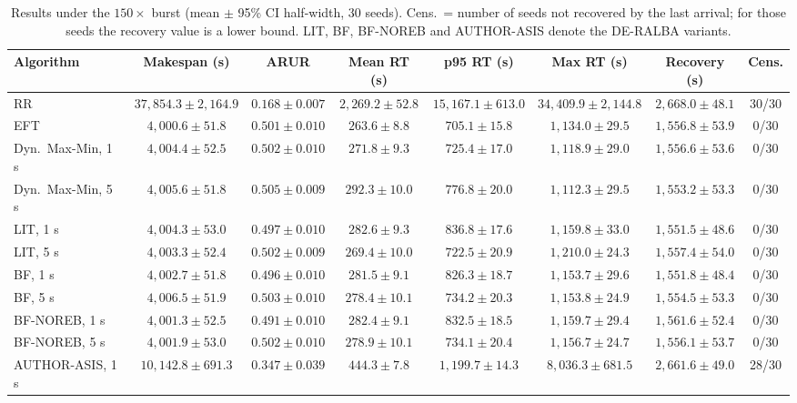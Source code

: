 \documentclass[default,sn-mathphys,Numbered]{sn-jnl}
\begin{document}
\begin{table}[h]
\caption{Results under the $150\times$ burst (mean $\pm$ 95\% CI half-width, 30 seeds). Cens.\ = number of seeds not recovered by the last arrival; for those seeds the recovery value is a lower bound. LIT, BF, BF-NOREB and AUTHOR-ASIS denote the DE-RALBA variants.}\label{tab:x150}
\centering
\fontsize{6.0pt}{7.4pt}\selectfont
\setlength{\tabcolsep}{2.6pt}
\begin{tabular}{lccccccc}
\toprule
Algorithm & Makespan (s) & ARUR & Mean RT (s) & p95 RT (s) & Max RT (s) & Recovery (s) & Cens. \\
\midrule
RR & $37{,}854.3\pm 2{,}164.9$ & $0.168\pm 0.007$ & $2{,}269.2\pm 52.8$ & $15{,}167.1\pm 613.0$ & $34{,}409.9\pm 2{,}144.8$ & $2{,}668.0\pm 48.1$ & 30/30 \\
EFT & $4{,}000.6\pm 51.8$ & $0.501\pm 0.010$ & $263.6\pm 8.8$ & $705.1\pm 15.8$ & $1{,}134.0\pm 29.5$ & $1{,}556.8\pm 53.9$ & 0/30 \\
Dyn.\ Max-Min, 1 s & $4{,}004.4\pm 52.5$ & $0.502\pm 0.010$ & $271.8\pm 9.3$ & $725.4\pm 17.0$ & $1{,}118.9\pm 29.0$ & $1{,}556.6\pm 53.6$ & 0/30 \\
Dyn.\ Max-Min, 5 s & $4{,}005.6\pm 51.8$ & $0.505\pm 0.009$ & $292.3\pm 10.0$ & $776.8\pm 20.0$ & $1{,}112.3\pm 29.5$ & $1{,}553.2\pm 53.3$ & 0/30 \\
LIT, 1 s & $4{,}004.3\pm 53.0$ & $0.497\pm 0.010$ & $282.6\pm 9.3$ & $836.8\pm 17.6$ & $1{,}159.8\pm 33.0$ & $1{,}551.5\pm 48.6$ & 0/30 \\
LIT, 5 s & $4{,}003.3\pm 52.4$ & $0.502\pm 0.009$ & $269.4\pm 10.0$ & $722.5\pm 20.9$ & $1{,}210.0\pm 24.3$ & $1{,}557.4\pm 54.0$ & 0/30 \\
BF, 1 s & $4{,}002.7\pm 51.8$ & $0.496\pm 0.010$ & $281.5\pm 9.1$ & $826.3\pm 18.7$ & $1{,}153.7\pm 29.6$ & $1{,}551.8\pm 48.4$ & 0/30 \\
BF, 5 s & $4{,}006.5\pm 51.9$ & $0.503\pm 0.010$ & $278.4\pm 10.1$ & $734.2\pm 20.3$ & $1{,}153.8\pm 24.9$ & $1{,}554.5\pm 53.3$ & 0/30 \\
BF-NOREB, 1 s & $4{,}001.3\pm 52.5$ & $0.491\pm 0.010$ & $282.4\pm 9.1$ & $832.5\pm 18.5$ & $1{,}159.7\pm 29.4$ & $1{,}561.6\pm 52.4$ & 0/30 \\
BF-NOREB, 5 s & $4{,}001.9\pm 53.0$ & $0.502\pm 0.010$ & $278.9\pm 10.1$ & $734.1\pm 20.4$ & $1{,}156.7\pm 24.7$ & $1{,}556.1\pm 53.7$ & 0/30 \\
AUTHOR-ASIS, 1 s & $10{,}142.8\pm 691.3$ & $0.347\pm 0.039$ & $444.3\pm 7.8$ & $1{,}199.7\pm 14.3$ & $8{,}036.3\pm 681.5$ & $2{,}661.6\pm 49.0$ & 28/30 \\
\bottomrule
\end{tabular}
\end{table}
\end{document}
